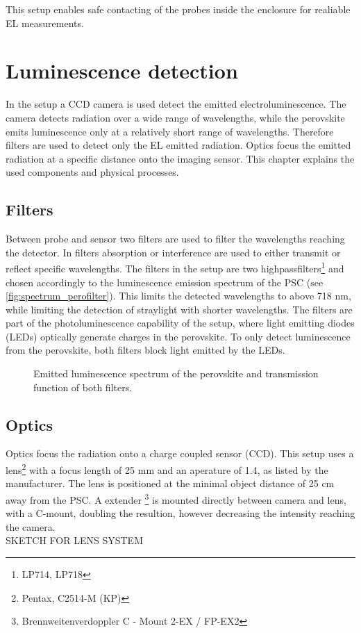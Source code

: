This setup enables safe contacting of the probes inside the enclosure for realiable EL measurements.

\section{Luminescence detection}\label{sec:luminescencedetection}
In the setup a CCD camera is used detect the emitted electroluminescence. The camera detects radiation over a wide range of wavelengths, while the perovskite emits luminescence only at a relatively short range of wavelengths. Therefore filters are used to detect only the EL emitted radiation. Optics focus the emitted radiation at a specific distance onto the imaging sensor. This chapter explains the used components and physical processes.
\subsection{Filters}
Between probe and sensor two filters are used to filter the wavelengths reaching the detector. In filters absorption or interference are used to either transmit or reflect specific wavelengths. The filters in the setup are two highpassfilters\footnote{LP714, LP718} and chosen accordingly to the luminescence emission spectrum of the PSC (see \autoref{fig:spectrum_perofilter}). This limits the detected wavelengths to above 718 nm, while limiting the detection of straylight with shorter wavelengths. The filters are part of the photoluminescence capability of the setup, where light emitting diodes (LEDs) optically generate charges in the perovskite. To only detect luminescence from the perovskite, both filters block light emitted by the LEDs.

\begin{figure}[h]
	\centering
	
	\caption{Emitted luminescence spectrum of the perovskite and transmission function of both filters. }
	\label{fig:spectrum_perofilter}
\end{figure}
\subsection{Optics}
Optics focus the radiation onto a charge coupled sensor (CCD). This setup uses a lens\footnote{Pentax, C2514-M (KP)} with a focus length of 25 mm and an aperature of 1.4, as listed by the manufacturer. The lens is positioned at the minimal object distance of  25 cm away from the PSC. A extender \footnote{Brennweitenverdoppler C - Mount 2-EX / FP-EX2} is mounted directly between camera and lens, with a C-mount, doubling the resultion, however decreasing the intensity reaching the camera.
\\
SKETCH FOR LENS SYSTEM
\\


